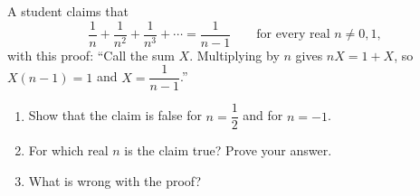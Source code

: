 A student claims that
\[\dfrac1n+\dfrac1{n^2}+\dfrac1{n^3}+\cdots=\dfrac{1}{n-1}\qquad\text{for every real }n\ne0,1,\]
with this proof: ``Call the sum $X$. Multiplying by $n$ gives $nX=1+X$, so $X(n-1)=1$ and $X=\dfrac{1}{n-1}$.''
\begin{enumerate}
\item[(a)] Show that the claim is false for $n=\dfrac12$ and for $n=-1$.
\item[(b)] For which real $n$ is the claim true? Prove your answer.
\item[(c)] What is wrong with the proof?
\end{enumerate}

